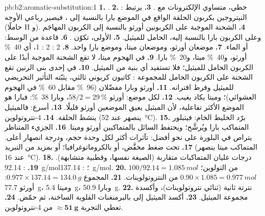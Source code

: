 \begin{solution}{pb:b2:aromatic-substitution:1}
\textbf{1.} .
\textbf{2.} : خطي، متساوي الإلكترونات مع .
\textbf{3.} يرتبط النيتروجين بكربون الحلقة الواقع في الموضع بارا بالنسبة إلى ، فيصير رباعي الأوجه
(حاملًا H و).
\textbf{4.} الشحنة الموجبة على الكربونين أورثو بالنسبة إلى الكربون المهاجَم وعلى
الكربون بارا بالنسبة إليه، الحامل للميثيل.
\textbf{5.} الأولى، تكوّن .
\textbf{6.} قاعدة من الوسط:  أو الماء.
\textbf{7.} موضعان أورثو، وموضعان ميتا، وموضع بارا واحد.
\textbf{8.} 2 : 2 : 1، أي 40~\% أورثو، و40~\% ميتا، و20~\% بارا.
\textbf{9.} في الهجوم ميتا، لا تقع الشحنة الموجبة أبدًا على الكربون الحامل للميثيل؛ فلا
تستفيد أي بنية من الميثيل.
\textbf{10.} في إحدى بنى الرنين تقع الشحنة على الكربون الحامل للمجموعة : كاتيون كربوني
ثالثي، يثبّته التأثير التحريضي للميثيل وفرط اقترانه.
\textbf{11.} أورثو وبارا مفضّلان (96~\% مقابل 60~\% في الهجوم العشوائي)؛ وميتا يكاد يغيب.
\textbf{12.} لكل موضع: أورثو $58/2 = 29~\%$، وبارا 38~\%: فبارا هو الموضع الأكثر تفاعلية،
لأن الميثيل يعيق الموضعين أورثو قليلًا.
\textbf{13.} أسرع: فالميثيل ينشط الحلقة.
\textbf{14.} 4-نتروتولوين (ينصهر عند \qty{52}{\degreeCelsius}).
\textbf{15.} برّد الخليط الخام: فيتبلور المتماكب بارا ويُرشَّح؛ ويحتفظ
السائل بالمتماكبين أورثو وميتا.
\textbf{16.} الجزيء المتناظر يتراص في البلورة على نحو أفضل: تآثرات أكثر لكل وحدة حجم،
ودرجة انصهار أعلى.
\textbf{17.}  تحت ضغط مخفَّض، أو بالكروماتوغرافيا؛ أو بمزيد من
التبريد (المتماكب ميتا ينصهر عند \qty{16}{\degreeCelsius}).
\textbf{18.} درجات غليان المتماكبات متقاربة (الصيغة نفسها، وقطبية متشابهة).
\textbf{19.} : \qty{92.14}{g/mol}؛ : \qty{137.14}{g/mol}.
\textbf{20.} $100/92.14 = \qty{1.085}{mol}$ من التولوين؛ $0.90 \times 1.085 = \qty{0.977}{mol}$ من
النتروتولوينات.
\textbf{21.} المجموع $0.977 \times 137.14 = \qty{134.0}{g}$: أورثو \qty{77.7}{g}، وميتا
\qty{5.4}{g}، وبارا \qty{50.9}{g}.
\textbf{22.} نترتة ثانية (ثنائي نتروتولوينات)، وأكسدة مجموعة الميثيل.
\textbf{23.} أكسد الميثيل إلى  بالبرمنغنات القلوية الساخنة، ثم حمّض.
\textbf{24.} تعطي التجربة $\boldsymbol{\approx \qty{51}{g}}$ من 4-نتروتولوين.
\end{solution}
